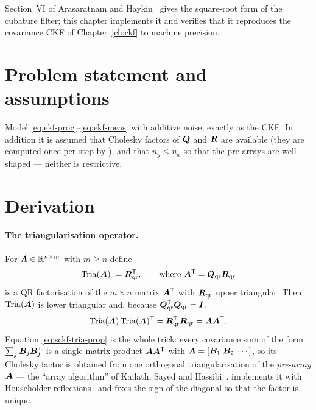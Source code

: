 Section~VI of Arasaratnam and Haykin~\cite{arasaratnam2009ckf} gives the square-root form of
the cubature filter; this chapter implements it and verifies that it reproduces the
covariance CKF of Chapter~\ref{ch:ckf} to machine precision.

\section{Problem statement and assumptions}
Model \eqref{eq:ekf-proc}--\eqref{eq:ekf-meas} with additive noise, exactly as the CKF. In
addition it is assumed that Cholesky factors of $\bm{Q}$ and $\bm{R}$ are available (they are
computed once per step by ), and that $n_y \le n_x$ so that the
pre-arrays are well shaped --- neither is restrictive.

\section{Derivation}
\paragraph{The triangularisation operator.} For $\bm{A}\in\mathbb{R}^{n\times m}$ with $m\ge n$
define
\begin{equation}
\operatorname{Tria}(\bm{A}) := \bm{R}_{\mathrm{qr}}^{\mathsf{T}}, \qquad \text{where } \bm{A}^{\mathsf{T}} = \bm{Q}_{\mathrm{qr}}\bm{R}_{\mathrm{qr}}
\label{eq:sckf-tria}
\end{equation}
is a QR factorisation of the $m\times n$ matrix $\bm{A}^{\mathsf{T}}$ with $\bm{R}_{\mathrm{qr}}$ upper
triangular. Then $\operatorname{Tria}(\bm{A})$ is lower triangular and, because
$\bm{Q}_{\mathrm{qr}}^{\mathsf{T}}\bm{Q}_{\mathrm{qr}} = \bm{I}$,
\begin{equation}
\operatorname{Tria}(\bm{A})\operatorname{Tria}(\bm{A})^{\mathsf{T}} = \bm{R}_{\mathrm{qr}}^{\mathsf{T}}\bm{R}_{\mathrm{qr}}
 = \bm{A}\bm{A}^{\mathsf{T}} .
\label{eq:sckf-tria-prop}
\end{equation}
Equation \eqref{eq:sckf-tria-prop} is the whole trick: every covariance sum of the form
$\sum_j \bm{B}_j\bm{B}_j^{\mathsf{T}}$ is a single matrix product $\bm{A}\bm{A}^{\mathsf{T}}$ with
$\bm{A} = [\bm{B}_1\;\bm{B}_2\;\cdots]$, so its Cholesky factor is obtained from one orthogonal
triangularisation of the \emph{pre-array} $\bm{A}$ --- the ``array algorithm'' of Kailath, Sayed
and Hassibi~\cite[Ch.~12]{kailath2000}.  implements it with Householder
reflections~\cite[Alg.~5.2.1]{golubvanloan2013} and fixes the sign of the diagonal so that the
factor is unique.

